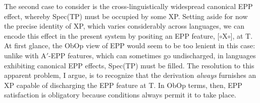 \documentclass[11pt, letterpaper]{paper_nick}
\newcommand{\fm}[1]{[$\circ$#1$\circ$]}
\begin{document}
The second case to consider is the cross-linguistically widespread canonical EPP effect, whereby Spec(TP) must be occupied by some XP. Setting aside for now the precise identity of XP, which varies considerably across languages, we can encode this effect in the present system by positing an EPP feature, \fm{X}, at T. At first glance, the ObOp view of EPP would seem to be too lenient in this case: unlike with A$'$-EPP features, which can sometimes go undischarged, in languages exhibiting canonical EPP effects, Spec(TP) must be filled. The resolution to this apparent problem, I argue, is to recognize that the derivation \emph{always} furnishes an XP capable of discharging the EPP feature at T. In ObOp terms, then, EPP satisfaction is obligatory because conditions always permit it to take place. 
\end{document}
